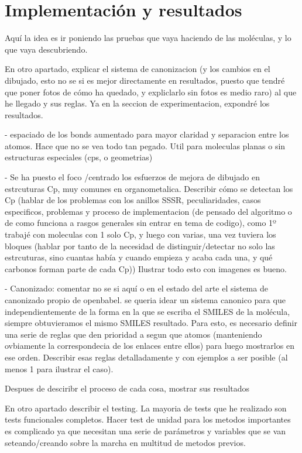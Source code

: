 
\chapter{Implementación y resultados}

Aquí la idea es ir poniendo las pruebas que vaya haciendo de las moléculas, y lo que vaya descubriendo.

En otro apartado, explicar el sistema de canonizacion (y los cambios en el dibujado, esto no se si es mejor directamente en resultados, puesto que tendré que poner fotos de cómo ha quedado, y expliclarlo sin fotos es medio raro) al que he llegado y sus reglas. Ya en la seccion de experimentacion, expondré los resultados.

 - espaciado de los bonds aumentado para mayor claridad y separacion entre los atomos. Hace que no se vea todo tan pegado. Util para moleculas planas o sin estructuras especiales (cps, o geometrias)

 - Se ha puesto el foco /centrado los esfuerzos de mejora de dibujado en estrcuturas Cp, muy comunes en organometalica. Describir cómo se detectan los Cp (hablar de los problemas con los anillos SSSR, peculiaridades, casos especificos, problemas y proceso de implementacion (de pensado del algoritmo o de como funciona a rasgos generales sin entrar en tema de codigo), como 1º trabajé con moleculas con 1 solo Cp, y luego con varias, una vez tuviera los bloques (hablar por tanto de la necesidad de distinguir/detectar no solo las estrcuturas, sino cuantas había y cuando empieza y acaba cada una, y qué carbonos forman parte de cada Cp))
 Ilustrar todo esto con imagenes es bueno.

 - Canonizado: comentar no se si aquí o en el estado del arte el sistema de canonizado propio de openbabel. se queria idear un sistema canonico para que independientemente de la forma en la que se escriba el SMILES de la molécula, siempre obtuvieramos el mismo SMILES resultado. Para esto, es necesario definir una serie de reglas que den prioridad a segun que atomos (manteniendo ovbiamente la correspondecia de los enlaces entre ellos) para luego mostrarlos en ese orden. Describir esas reglas detalladamente y con ejemplos a ser posible (al menos 1 para ilustrar el caso).


Despues de desciribr el proceso de cada cosa, mostrar sus resultados

 En otro apartado describir el testing. La mayoria de tests que he realizado son tests funcionales completos. Hacer test de unidad para los metodos importantes es complicado ya que necesitan una serie de parámetros y variables que se van seteando/creando sobre la marcha en multitud de metodos previos.

